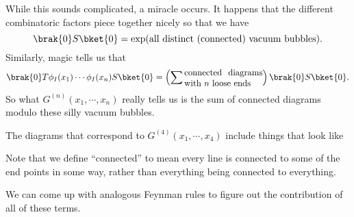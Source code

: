 \documentclass[a4paper]{article}
\begin{document}
While this sounds complicated, a miracle occurs. It happens that the different combinatoric factors piece together nicely so that we have
\[
  \brak{0}S \bket{0} = \exp(\text{all distinct (connected) vacuum bubbles}).
\]
Similarly, magic tells us that
\[
  \brak{0}T\phi_I(x_1) \cdots \phi_I(x_n) S \bket{0} =\left(\sum \parbox{9em}{connected diagrams with $n$ loose ends}\right) \brak{0}S\bket{0}.
\]
So what $G^{(n)}(x_1, \cdots, x_n)$ really tells us is the sum of connected diagrams modulo these silly vacuum bubbles.

\begin{eg}
  The diagrams that correspond to $G^{(4)}(x_1, \cdots, x_4)$ include things that look like
  \begin{center}
  \end{center}
  Note that we define ``connected'' to mean every line is connected to some of the end points in some way, rather than everything being connected to everything.
\end{eg}
We can come up with analogous Feynman rules to figure out the contribution of all of these terms.
\end{document}
